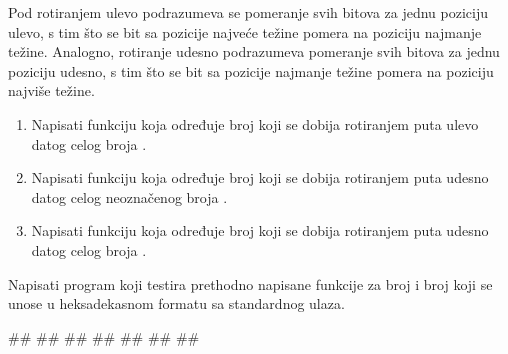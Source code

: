 \begin{Exercise}[label=1_09] %
Pod rotiranjem ulevo podrazumeva se pomeranje svih bitova za jednu poziciju ulevo, s tim što se bit sa pozicije najveće težine pomera na poziciju najmanje težine. Analogno, rotiranje udesno podrazumeva pomeranje svih bitova za jednu poziciju udesno, s tim što se bit sa pozicije najmanje težine pomera na poziciju najviše težine.
\begin{enumerate}
\item Napisati funkciju  koja određuje broj koji se dobija rotiranjem  puta ulevo datog celog broja . 
\item Napisati funkciju  koja određuje broj koji se dobija rotiranjem  puta udesno datog celog neoznačenog broja . 
\item Napisati funkciju  koja određuje broj koji se dobija rotiranjem  puta udesno datog celog broja . 
\end{enumerate}
Napisati program koji testira prethodno napisane funkcije za broj  i broj  koji se unose u heksadekasnom formatu sa standardnog ulaza.


\begin{maxitest}
\begin{upotreba}{1}
#\naslovInt#
##
##
##
##
##
##
\end{upotreba}
\end{maxitest}

\end{Exercise}
\begin{Answer}[ref=1_09]
\end{Answer}

